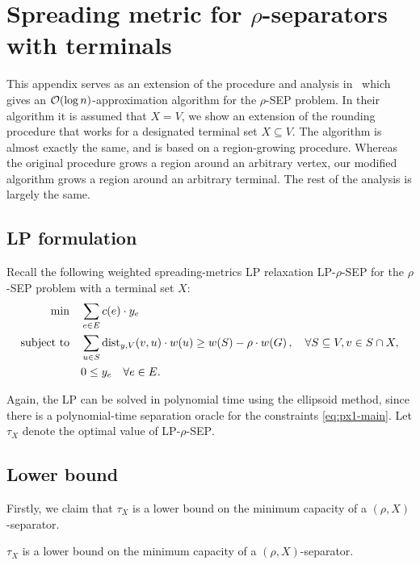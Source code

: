 \section{Spreading metric for $\rho$-separators with terminals}\label{app:terminal-extension}

This appendix serves as an extension of the procedure and analysis in~\cite{FastApproximateGraphPartitioningAlgorithms} which gives an $\mathcal{O}\mathopen{}\left( \log n \right)$-approximation algorithm for the \textsc{$\rho$-SEP} problem. In their algorithm it is assumed that $X=V$, we show an extension of the rounding procedure that works for a designated terminal set $X\subseteq V$. The algorithm is almost exactly the same, and is based on a region-growing procedure. Whereas the original procedure grows a region around an arbitrary vertex, our modified algorithm grows a region around an arbitrary terminal. The rest of the analysis is largely the same.

\subsection{LP formulation}
Recall the following weighted spreading-metrics \textsc{LP} relaxation \textsc{LP-$\rho$-SEP} for the \textsc{$\rho$-SEP} problem with a terminal set $X$:
\begin{align}
    \min \quad &\sum_{e\in E} c(e)\cdot y_e \\
    \text{subject to} \quad &\sum_{u\in S} \text{dist}_{y,V}(v,u)\cdot w(u) \geq w\mathopen{}\left( S \right)-\rho\cdot w\mathopen{}\left( G \right), \quad \forall S\subseteq V, v\in S\cap X, \label{eq:px1-main}\\
    &0\leq y_e \quad \forall e\in E.
\end{align}

Again, the LP can be solved in polynomial time using the ellipsoid method, since there is a polynomial-time separation oracle for the constraints \eqref{eq:px1-main}. Let $\tau_X$ denote the optimal value of \textsc{LP-$\rho$-SEP}.

\subsection{Lower bound}
Firstly, we claim that $\tau_X$ is a lower bound on the minimum capacity of a $(\rho,X)$-separator.
\begin{lemma}
$\tau_X$ is a lower bound on the minimum capacity of a $(\rho,X)$-separator.
\end{lemma}

